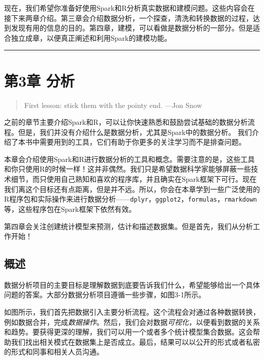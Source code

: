 \documentclass[
]{article}
\begin{document}
现在，我们希望你准备好使用Spark和R分析真实数据和建模问题。这些内容会在接下来两章介绍。第三章会介绍数据分析，一个探查，清洗和转换数据的过程，达到发现有用的信息的目的。第四章，建模，可以看做是数据分析的一部分。但是适合独立成章，以便真正阐述和利用Spark的建模功能。

\begin{center}\rule{0.5\linewidth}{\linethickness}\end{center}

\hypertarget{ux7b2c3ux7ae0-ux5206ux6790}{%
\section{第3章 分析}\label{ux7b2c3ux7ae0-ux5206ux6790}}

\begin{quote}
First lesson: stick them with the pointy end. ---Jon Snow
\end{quote}

之前的章节主要介绍Spark和R，可以让你快速熟悉和鼓励尝试基础的数据分析流程。但是，我们并没有介绍什么是数据分析，尤其是Spark中的数据分析。
我们介绍了本书中需要用到的工具，它们有助于你更多的关注学习而不是排查问题。

本章会介绍使用Spark和R进行数据分析的工具和概念。需要注意的是，这些工具和你只使用R的时候一样！这并非偶然。我们只是希望数据科学家能够屏蔽一些技术细节，而只使用自己熟知和喜欢的程序库，并且确实在Spark框架下可行。现在我们离这个目标还有点距离，但是并不远。所以，你会在本章学到一些广泛使用的R程序包和实际操作来进行数据分析------\texttt{dplyr}，\texttt{ggplot2}，\texttt{formulas}，\texttt{rmarkdown}等，这些程序包在Spark框架下依然有效。

第四章会关注创建统计模型来预测，估计和描述数据集。但是首先，我们从分析工作开始！

\hypertarget{ux6982ux8ff0-2}{%
\subsection{概述}\label{ux6982ux8ff0-2}}

数据分析项目的主要目标是理解数据到底要告诉我们什么，希望能够给出一个具体问题的答案。大部分数据分析项目遵循一些步骤，如图3-1所示。

如图所示，我们首先把数据引入主要分析流程。这个流程会对通过各种数据转换，例如数据合并，完成\emph{数据操作}。然后，我们会对数据\emph{可视化}，以便看到数据的关系和趋势。要获得更深的理解，我们可以用一个或者多个统计模型集合数据。这会帮助我们找出相关模式在数据集上是否成立。最后，结果可以以公开的形式或者私密的形式和同事和相关人员沟通。
\end{document}
